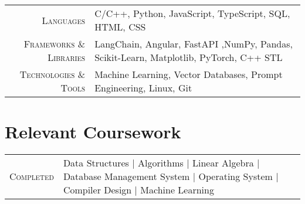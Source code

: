 \documentclass[a4paper,10pt]{extarticle}
\begin{document}
\begin{tabular}{r|p{15cm}}
\textsc{Languages} & C/C++, Python, JavaScript, TypeScript, SQL, HTML, CSS\\
\textsc{Frameworks \& Libraries} & LangChain, Angular, FastAPI ,NumPy, Pandas, Scikit-Learn, Matplotlib, PyTorch, C++ STL\\
\textsc{Technologies \& Tools} & Machine Learning, Vector Databases, Prompt Engineering, Linux, Git
\end{tabular}

\vspace{+0.2cm}
\section{\textcolor{primary}{Relevant Coursework}}
\vspace{+0.1cm}

\begin{tabular}{r|p{15cm}}
\textsc{Completed} & Data Structures | Algorithms | Linear Algebra | Database Management System | Operating System | Compiler Design | Machine Learning 
\end{tabular}
\end{document}
